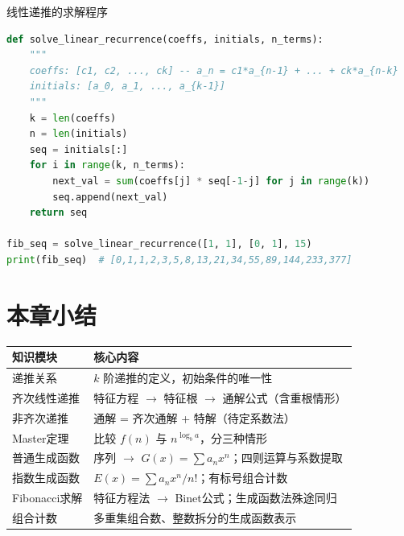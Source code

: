 \begin{mycode}{线性递推的求解程序}
\begin{lstlisting}[language=Python]
def solve_linear_recurrence(coeffs, initials, n_terms):
    """
    coeffs: [c1, c2, ..., ck] -- a_n = c1*a_{n-1} + ... + ck*a_{n-k}
    initials: [a_0, a_1, ..., a_{k-1}]
    """
    k = len(coeffs)
    n = len(initials)
    seq = initials[:]
    for i in range(k, n_terms):
        next_val = sum(coeffs[j] * seq[-1-j] for j in range(k))
        seq.append(next_val)
    return seq

fib_seq = solve_linear_recurrence([1, 1], [0, 1], 15)
print(fib_seq)  # [0,1,1,2,3,5,8,13,21,34,55,89,144,233,377]
\end{lstlisting}
\end{mycode}

\section*{本章小结}

\begin{table}[H]
\centering
\begin{tabular}{lp{10cm}}
\toprule
知识模块 & 核心内容 \\
\midrule
递推关系 & \(k\) 阶递推的定义，初始条件的唯一性 \\
齐次线性递推 & 特征方程 \(\to\) 特征根 \(\to\) 通解公式（含重根情形） \\
非齐次递推 & 通解 = 齐次通解 + 特解（待定系数法） \\
Master定理 & 比较 \(f(n)\) 与 \(n^{\log_b a}\)，分三种情形 \\
普通生成函数 & 序列 \(\to\) \(G(x)=\sum a_n x^n\)；四则运算与系数提取 \\
指数生成函数 & \(E(x)=\sum a_n x^n/n!\)；有标号组合计数 \\
Fibonacci求解 & 特征方程法 \(\to\) Binet公式；生成函数法殊途同归 \\
组合计数 & 多重集组合数、整数拆分的生成函数表示 \\
\bottomrule
\end{tabular}
\end{table}
